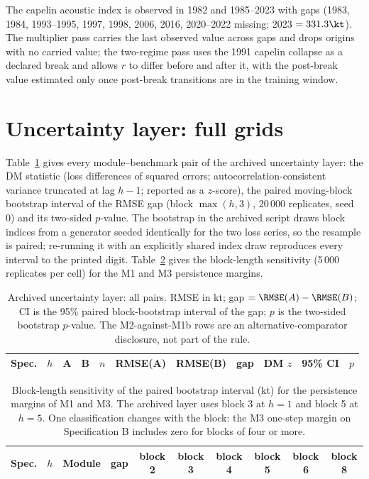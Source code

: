 The capelin acoustic index is observed in 1982 and 1985--2023 with gaps (1983, 1984, 1993--1995, 1997, 1998, 2006, 2016, 2020--2022 missing; 2023 $= 331.3\kt$). The multiplier pass carries the last observed value across gaps and drops origins with no carried value; the two-regime pass uses the 1991 capelin collapse as a declared break and allows $r$ to differ before and after it, with the post-break value estimated only once post-break transitions are in the training window.

\FloatBarrier
\section{Uncertainty layer: full grids}\label{si:uncertainty}

Table~\ref{tab:si_dm} gives every module--benchmark pair of the archived uncertainty layer: the DM statistic (loss differences of squared errors; autocorrelation-consistent variance truncated at lag $h-1$; reported as a $z$-score), the paired moving-block bootstrap interval of the RMSE gap (block $\max(h,3)$, 20\,000 replicates, seed 0) and its two-sided $p$-value. The bootstrap in the archived script draws block indices from a generator seeded identically for the two loss series, so the resample is paired; re-running it with an explicitly shared index draw reproduces every interval to the printed digit. Table~\ref{tab:si_blocks} gives the block-length sensitivity (5\,000 replicates per cell) for the M1 and M3 persistence margins.

\begin{table}[!htb]
\centering\scriptsize
\setlength{\tabcolsep}{3.5pt}
\caption{Archived uncertainty layer: all pairs. RMSE in kt; gap $=\RMSE(A)-\RMSE(B)$; CI is the 95\% paired block-bootstrap interval of the gap; $p$ is the two-sided bootstrap $p$-value. The M2-against-M1b rows are an alternative-comparator disclosure, not part of the rule.}
\label{tab:si_dm}
\begin{tabular}{@{}ccllrrrrrlr@{}}
\toprule
Spec. & $h$ & A & B & $n$ & RMSE(A) & RMSE(B) & gap & DM $z$ & 95\% CI & $p$ \\
\midrule

\bottomrule
\end{tabular}
\end{table}

\begin{table}[!htb]
\centering\scriptsize
\setlength{\tabcolsep}{2.6pt}
\caption{Block-length sensitivity of the paired bootstrap interval (kt) for the persistence margins of M1 and M3. The archived layer uses block 3 at $h=1$ and block 5 at $h=5$. One classification changes with the block: the M3 one-step margin on Specification B includes zero for blocks of four or more.}
\label{tab:si_blocks}
\begin{tabular}{@{}cclrcccccc@{}}
\toprule
Spec. & $h$ & Module & gap & block 2 & block 3 & block 4 & block 5 & block 6 & block 8 \\
\midrule

\bottomrule
\end{tabular}
\end{table}

